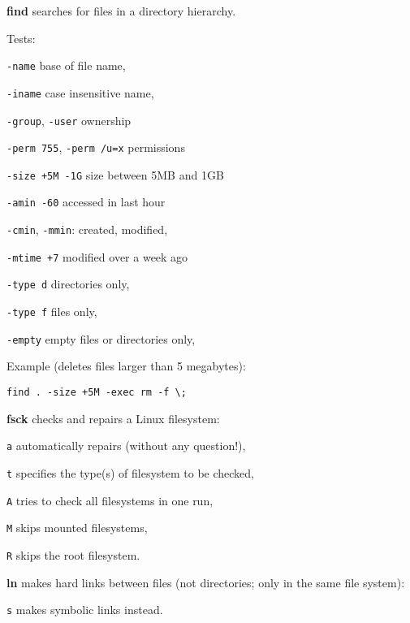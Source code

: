 \begin{enumx}
	\item [\cmd] \textbf{find} searches for files in a directory hierarchy.
	\item Tests:
	\begin{itemx}
	\item \texttt{-name} \hfill base of file name,
	\item \texttt{-iname} \hfill case insensitive name,
	\item \texttt{-group}, \texttt{-user} \hfill ownership
	\item \texttt{-perm 755}, \texttt{-perm /u=x} \hfill permissions
	\item \texttt{-size +5M -1G} \hfill size between 5MB and 1GB
	\item \texttt{-amin -60} \hfill accessed in last hour
	\item \texttt{-cmin}, \texttt{-mmin}: \hfill created, modified,
	\item \texttt{-mtime +7} \hfill modified over a week ago
	\item \texttt{-type d} \hfill directories only,
	\item \texttt{-type f} \hfill files only,
	\item \texttt{-empty} \hfill empty files or directories only,
	\end{itemx}
	\item Example (deletes files larger than 5 megabytes): 
	\begin{itemx}
	\item \texttt{find . -size +5M -exec rm -f {} \textbackslash{};}
	\end{itemx}
\end{enumx}

\begin{enumx}
	\item [\cmd] \textbf{fsck} checks and repairs a Linux filesystem:
	\item [\texttt{a}] automatically repairs (without any question!),
	\item [\texttt{t}] specifies the type(s) of filesystem to be checked,
	\item [\texttt{A}] tries to check all filesystems in one run,
	\item [\texttt{M}] skips mounted filesystems,
	\item [\texttt{R}] skips the root filesystem.
\end{enumx}

\begin{enumx}
	\item [\cmdblack] \textbf{ln} makes hard links between files
	(not directories; only in the same file system):
	\item [\texttt{s}]  makes symbolic links instead.
\end{enumx}

